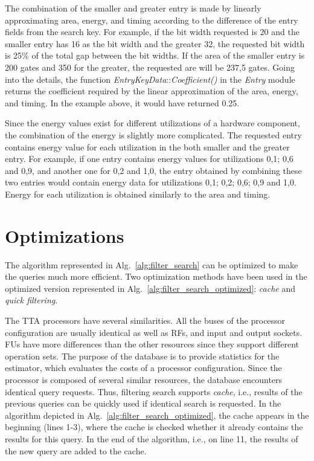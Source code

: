 \documentclass[a4paper,twoside]{tce}
\begin{document}
The combination of the smaller and greater entry is made by linearly
approximating area, energy, and timing according to the difference of
the entry fields from the search key. For example, if the bit width
requested is 20 and the smaller entry has 16 as the bit width and the
greater 32, the requested bit width is 25\% of the total gap between
the bit widths. If the area of the smaller entry is 200 gates and 350
for the greater, the requested are will be 237,5 gates. Going into the
details, the function \emph{EntryKeyData}::\emph{Coefficient()} in
the \emph{Entry} module returns the coefficient required by the
linear approximation of the area, energy, and timing. In the example
above, it would have returned 0.25.

Since the energy values exist for different utilizations of a hardware
component, the combination of the energy is slightly more
complicated. The requested entry contains energy value for each
utilization in the both smaller and the greater entry. For example, if
one entry contains energy values for utilizations 0,1; 0,6 and 0,9, and
another one for 0,2 and 1,0, the entry obtained by combining these two
entries would contain energy data for utilizations 0,1; 0,2; 0,6; 0,9
and 1,0. Energy for each utilization is obtained similarly to the area
and timing.

\section{Optimizations}

The algorithm represented in Alg.~\ref{alg:filter_search} can be
optimized to make the queries much more efficient. Two optimization
methods have been used in the optimized version represented in
Alg.~\ref{alg:filter_search_optimized}: \emph{cache} and
\emph{quick filtering}.

The TTA processors have several similarities. All the buses of the
processor configuration are usually identical as well as RFs, and
input and output sockets. FUs have more differences than the other
resources since they support different operation sets. The purpose of
the database is to provide statistics for the estimator, which
evaluates the costs of a processor configuration. Since the processor
is composed of several similar resources, the database encounters
identical query requests. Thus, filtering search supports
\emph{cache}, i.e., results of the previous queries can be quickly
used if identical search is requested. In the algorithm depicted in
Alg.~\ref{alg:filter_search_optimized}, the cache appears in the
beginning (lines 1-3), where the cache is checked whether it already
contains the results for this query. In the end of the algorithm,
i.e., on line 11, the results of the new query are added to the cache.
\end{document}

